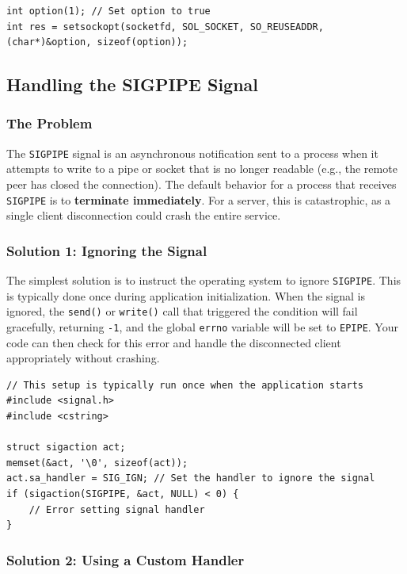 \documentclass{article}
\begin{document}
\begin{verbatim}
int option(1); // Set option to true
int res = setsockopt(socketfd, SOL_SOCKET, SO_REUSEADDR, (char*)&option, sizeof(option));
\end{verbatim}

\subsection{Handling the SIGPIPE Signal}

\subsubsection{The Problem}

The \texttt{SIGPIPE} signal is an asynchronous notification sent to a process when it attempts to write to a pipe or socket that is no longer readable (e.g., the remote peer has closed the connection). The default behavior for a process that receives \texttt{SIGPIPE} is to \textbf{terminate immediately}. For a server, this is catastrophic, as a single client disconnection could crash the entire service.

\subsubsection{Solution 1: Ignoring the Signal}

The simplest solution is to instruct the operating system to ignore \texttt{SIGPIPE}. This is typically done once during application initialization. When the signal is ignored, the \texttt{send()} or \texttt{write()} call that triggered the condition will fail gracefully, returning \texttt{-1}, and the global \texttt{errno} variable will be set to \texttt{EPIPE}. Your code can then check for this error and handle the disconnected client appropriately without crashing.

\begin{verbatim}
// This setup is typically run once when the application starts
#include <signal.h>
#include <cstring>

struct sigaction act;
memset(&act, '\0', sizeof(act));
act.sa_handler = SIG_IGN; // Set the handler to ignore the signal
if (sigaction(SIGPIPE, &act, NULL) < 0) {
    // Error setting signal handler
}
\end{verbatim}

\subsubsection{Solution 2: Using a Custom Handler}
\end{document}
